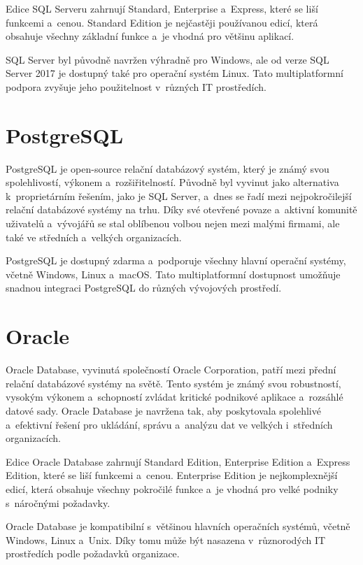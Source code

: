 \documentclass[czech, kiv, ba, he, iso690numb, pdf]{fasthesis}
\begin{document}
Edice SQL Serveru zahrnují Standard, Enterprise a~Express, 
které se liší funkcemi a~cenou. Standard Edition je nejčastěji používanou edicí, 
která obsahuje všechny základní funkce a~je vhodná pro většinu aplikací.

SQL Server byl původně navržen výhradně pro Windows, ale od verze SQL Server 2017 je dostupný 
také pro operační systém Linux. Tato multiplatformní podpora zvyšuje jeho použitelnost 
v~různých IT prostředích.
\cite{microsoft_sql_server}

\section{PostgreSQL}
PostgreSQL je open-source relační databázový systém, který je známý svou spolehlivostí, výkonem 
a~rozšiřitelností. Původně byl vyvinut jako alternativa k~proprietárním řešením, jako je SQL Server, 
a~dnes se řadí mezi nejpokročilejší relační databázové systémy na trhu. Díky své otevřené povaze 
a~aktivní komunitě uživatelů a~vývojářů se stal oblíbenou volbou nejen mezi malými firmami, 
ale také ve středních a~velkých organizacích.

PostgreSQL je dostupný zdarma a~podporuje všechny hlavní operační systémy, včetně Windows, Linux a~macOS. 
Tato multiplatformní dostupnost umožňuje snadnou integraci PostgreSQL do různých vývojových prostředí.
\cite{postgresql}

\section{Oracle}
Oracle Database, vyvinutá společností Oracle Corporation, patří mezi přední relační 
databázové systémy na světě. Tento systém je známý svou robustností, vysokým výkonem 
a~schopností zvládat kritické podnikové aplikace a~rozsáhlé datové sady. Oracle Database 
je navržena tak, aby poskytovala spolehlivé a~efektivní řešení pro ukládání, správu 
a~analýzu dat ve velkých i~středních organizacích.

Edice Oracle Database zahrnují Standard Edition, Enterprise Edition a~Express Edition,
které se liší funkcemi a~cenou. Enterprise Edition je nejkomplexnější edicí, která
obsahuje všechny pokročilé funkce a~je vhodná pro velké podniky s~náročnými požadavky.

Oracle Database je kompatibilní s~většinou hlavních operačních systémů, včetně Windows, 
Linux a~Unix. Díky tomu může být nasazena v~různorodých IT prostředích podle požadavků organizace.
\cite{oracle_database}
\end{document}
